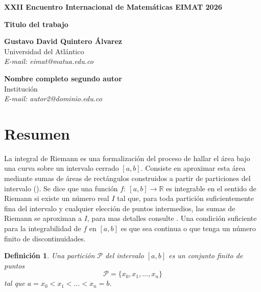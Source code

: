 \documentclass[11pt]{article}
\newtheorem{definicion}{Definición}
\begin{document}
\noindent

\begin{center}
\Large\bf{XXII Encuentro Internacional de Matem\'{a}ticas 
EIMAT 2026}
\end{center}

\vspace{1cm}

\begin{center}
\Large\bf{Titulo del trabajo}
\end{center}

\vspace{0.5cm}

\begin{center}
\textbf{Gustavo David Quintero Álvarez}\\
Universidad del Atlántico\\
\emph{E-mail: eimat@matua.edu.co}
\end{center}

\begin{center}
\textbf{Nombre completo segundo autor}\\
Institución\\
\emph{E-mail: autor2@dominio.edu.co}
\end{center}

\vspace{0.5cm}
\section*{Resumen}
La integral de Riemann es una formalización del proceso de hallar el área bajo una curva sobre un intervalo cerrado \( [a, b] \). Consiste en aproximar esta área mediante sumas de áreas de rectángulos construidos a partir de particiones del intervalo (\cite{bartle2000, apostol1974}). Se dice que una función \( f:~[a,b] \to \mathbb{R} \) es integrable en el sentido de Riemann si existe un número real \( I \) tal que, para toda partición suficientemente fina del intervalo y cualquier elección de puntos intermedios, las sumas de Riemann se aproximan a \( I \), para mas detalles consulte \cite{rudin1976}. Una condición suficiente para la integrabilidad de \( f \) en \( [a,b] \) es que sea continua o que tenga un número finito de discontinuidades. 

\begin{definicion}
Una partición \( \mathcal{P} \) del intervalo \( [a,b] \) es un conjunto finito de puntos
\[
\mathcal{P} = \{ x_0, x_1, \dots, x_n \}
\]
tal que \( a = x_0 < x_1 < \dots < x_n = b \).
\end{definicion}
\end{document}
